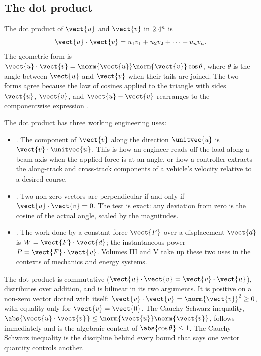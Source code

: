 \subsection{The dot product}

The dot product of $\vect{u}$ and $\vect{v}$ in $2.4^{n}$ is
\[
\vect{u} \cdot \vect{v} = u_{1} v_{1} + u_{2} v_{2} + \cdots +
u_{n} v_{n}.
\]
The geometric form is $\vect{u} \cdot \vect{v} = \norm{\vect{u}}
\norm{\vect{v}} \cos\theta$, where $\theta$ is the angle between
$\vect{u}$ and $\vect{v}$ when their tails are joined. The two forms
agree because the law of cosines applied to the triangle with sides
$\vect{u}$, $\vect{v}$, and $\vect{u} - \vect{v}$ rearranges to the
componentwise expression \cite{text:strang2016}.

The dot product has three working engineering uses:

\begin{itemize}[leftmargin=*]
  \item {}. The component of $\vect{v}$ along the
    direction $\unitvec{u}$ is $\vect{v} \cdot \unitvec{u}$. This is
    how an engineer reads off the load along a beam axis when the
    applied force is at an angle, or how a controller extracts the
    along-track and cross-track components of a vehicle's velocity
    relative to a desired course.
  \item {}. Two non-zero vectors are
    perpendicular if and only if $\vect{u} \cdot \vect{v} = 0$. The
    test is exact: any deviation from zero is the cosine of the
    actual angle, scaled by the magnitudes.
  \item {}. The work done by a constant
    force $\vect{F}$ over a displacement $\vect{d}$ is
    $W = \vect{F} \cdot \vect{d}$; the instantaneous power
    $P = \vect{F} \cdot \vect{v}$. Volumes III and V take up these
    two uses in the contexts of mechanics and energy systems.
\end{itemize}

The dot product is commutative ($\vect{u} \cdot \vect{v} = \vect{v}
\cdot \vect{u}$), distributes over addition, and is bilinear in its
two arguments. It is positive on a non-zero vector dotted with itself:
$\vect{v} \cdot \vect{v} = \norm{\vect{v}}^{2} \geq 0$, with
equality only for $\vect{v} = \vect{0}$. The Cauchy-Schwarz
inequality, $\abs{\vect{u} \cdot \vect{v}} \leq \norm{\vect{u}}
\norm{\vect{v}}$, follows immediately and is the algebraic content of
$\abs{\cos\theta} \leq 1$. The Cauchy-Schwarz inequality is the
discipline behind every bound that says one vector quantity controls
another.

